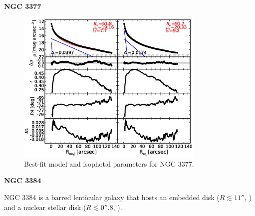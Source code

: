 \documentclass[preprint2]{emulateapj}
\newcommand{\fitfigurewidth}{0.8\textwidth}
\begin{document}
  \clearpage\newpage\noindent

  {\bf NGC 3377 \\}

  \begin{figure}[h]
  \begin{center}
  \includegraphics[width=\fitfigurewidth]{images/n3377_1Dfit.eps}
  \caption{Best-fit model and isophotal parameters for NGC 3377.}
  \end{center}
  \end{figure}


  \clearpage\newpage\noindent
  {\bf NGC 3384 \\}

  NGC 3384 is a barred lenticular galaxy that hosts 
  an embedded disk ($R \lesssim 11''$, \citealt{erwin2004}) and 
  a nuclear stellar disk ($R \lesssim 0''.8$, \citealt{ledo2010}).

\end{document}
